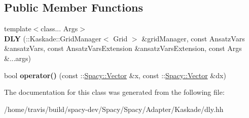 \subsection*{Public Member Functions}
\begin{DoxyCompactItemize}
\item 
\hypertarget{classSpacy_1_1Kaskade_1_1DLY_ad6ad6ff4ac8b00b0f6c3a607e99f0a81}{{\footnotesize template$<$class... Args$>$ }\\{\bfseries D\-L\-Y} (\-::Kaskade\-::\-Grid\-Manager$<$ Grid $>$ \&grid\-Manager, const Ansatz\-Vars \&ansatz\-Vars, const Ansatz\-Vars\-Extension \&ansatz\-Vars\-Extension, const Args \&...args)}\label{classSpacy_1_1Kaskade_1_1DLY_ad6ad6ff4ac8b00b0f6c3a607e99f0a81}

\item 
\hypertarget{classSpacy_1_1Kaskade_1_1DLY_ad65881ff822a7407900909dcb8fad771}{bool {\bfseries operator()} (const \-::\hyperlink{classSpacy_1_1Vector}{Spacy\-::\-Vector} \&x, const \-::\hyperlink{classSpacy_1_1Vector}{Spacy\-::\-Vector} \&dx)}\label{classSpacy_1_1Kaskade_1_1DLY_ad65881ff822a7407900909dcb8fad771}

\end{DoxyCompactItemize}


The documentation for this class was generated from the following file\-:\begin{DoxyCompactItemize}
\item 
/home/travis/build/spacy-\/dev/\-Spacy/\-Spacy/\-Adapter/\-Kaskade/dly.\-hh\end{DoxyCompactItemize}

